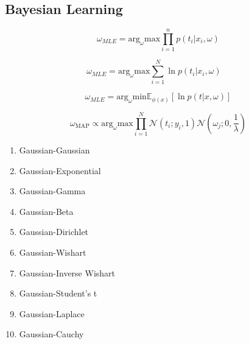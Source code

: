 \documentclass[10pt]{article}
\begin{document}
\begin{multicols}{2}

\subsection*{Bayesian Learning}
\begin{equation}
    \label{eq:bayesian-ls}
    \omega_{MLE} = \text{arg}_{\omega}\text{max} \prod_{i=1}^{n} p(t_{i} | x_{i}, \omega)
\end{equation}

\begin{equation}
    \label{eq:bayesian-ls-2}
    \omega_{MLE} = \text{arg}_{\omega}\text{max} \sum_{i=1}^{N} \ln p(t_{i} | x_{i}, \omega) \quad
\end{equation}

\begin{equation*}
    \label{eq:bayesian-ls-3}
    \omega_{MLE} = \text{arg}_{\omega}\text{min} \mathbb{E}_{\phi(x)} [\ln p(t | x, \omega)]
\end{equation*}

\begin{equation}
    \label{eq:ridge-map}
    \omega_{\text{MAP}} \propto \text{arg}_{\omega}\text{max} \prod_{i=1}^{N} \mathcal{N}(t_i ; y_i, 1) \mathcal{N}(\omega_j ; 0 , \frac{1}{\lambda})
\end{equation}

\begin{enumerate}
    \item Gaussian-Gaussian
    \vspace*{-6pt}
    \item Gaussian-Exponential
    \vspace*{-6pt}
    \item Gaussian-Gamma
    \vspace*{-6pt}
    \item Gaussian-Beta
    \vspace*{-6pt}
    \item Gaussian-Dirichlet
    \vspace*{-6pt}
    \item Gaussian-Wishart
    \vspace*{-6pt}
    \item Gaussian-Inverse Wishart
    \vspace*{-6pt}
    \item Gaussian-Student's t
    \vspace*{-6pt}
    \item Gaussian-Laplace
    \vspace*{-6pt}
    \item Gaussian-Cauchy
\end{enumerate}


\end{multicols}
\end{document}
